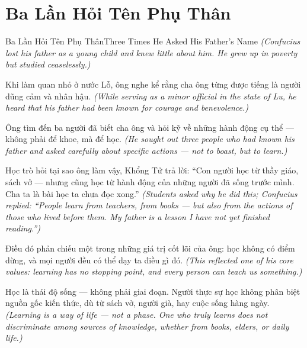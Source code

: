 \section{Ba Lần Hỏi Tên Phụ Thân}
\begin{truyen}{Ba Lần Hỏi Tên Phụ Thân}{Three Times He Asked His Father's Name}
\textit{(Confucius lost his father as a young child and knew little about him. He grew up in poverty but studied ceaselessly.)}

Khi làm quan nhỏ ở nước Lỗ, ông nghe kể rằng cha ông từng được tiếng là người dũng cảm và nhân hậu.
\textit{(While serving as a minor official in the state of Lu, he heard that his father had been known for courage and benevolence.)}

Ông tìm đến ba người đã biết cha ông và hỏi kỹ về những hành động cụ thể — không phải để khoe, mà để học.
\textit{(He sought out three people who had known his father and asked carefully about specific actions — not to boast, but to learn.)}

Học trò hỏi tại sao ông làm vậy, Khổng Tử trả lời: ``Con người học từ thầy giáo, sách vở — nhưng cũng học từ hành động của những người đã sống trước mình. Cha ta là bài học ta chưa đọc xong.''
\textit{(Students asked why he did this; Confucius replied: ``People learn from teachers, from books — but also from the actions of those who lived before them. My father is a lesson I have not yet finished reading.'')}

Điều đó phản chiếu một trong những giá trị cốt lõi của ông: học không có điểm dừng, và mọi người đều có thể dạy ta điều gì đó.
\textit{(This reflected one of his core values: learning has no stopping point, and every person can teach us something.)}

\end{truyen}

\begin{baihoc}
Học là thái độ sống — không phải giai đoạn. Người thực sự học không phân biệt nguồn gốc kiến thức, dù từ sách vở, người già, hay cuộc sống hàng ngày.
\textit{(Learning is a way of life — not a phase. One who truly learns does not discriminate among sources of knowledge, whether from books, elders, or daily life.)}
\end{baihoc}
\ngancach

